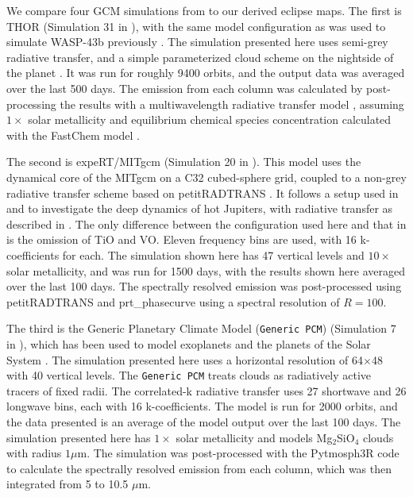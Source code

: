 \documentclass[twocolumn]{aastex631}
\begin{document}
We compare four GCM simulations from \citet{bell2023wasp43b} to our derived eclipse maps. The first is THOR \citep{mendoncca2016thor} (Simulation 31 in \citealp{bell2023wasp43b}), with the same model configuration as was used to simulate WASP-43b previously \citep{mendoncca2018revisiting,mendoncca2018three}. The simulation presented here uses semi-grey radiative transfer, and a simple parameterized cloud scheme on the nightside of the planet \citep{mendoncca2018revisiting}. It was run for roughly 9400 orbits, and the output data was averaged over the last 500 days. The emission from each column was calculated by post-processing the results with a multiwavelength radiative transfer model \citep{mendoncca2015new}, assuming $1{\times}$ solar metallicity and equilibrium chemical species concentration calculated with the FastChem model \citep{stock2018fastchem}.

The second is expeRT/MITgcm (Simulation 20 in \citealp{bell2023wasp43b}). This model uses the dynamical core of the MITgcm \citep{adcroft2004implementation} on a C32 cubed-sphere grid, coupled to a non-grey radiative transfer scheme based on petitRADTRANS \citep{molliere2019petitradtrans}. It follows a setup used in \citet{carone2020equatorial} and \citet{schneider2022exploring} to investigate the deep dynamics of hot Jupiters, with radiative transfer as described in \citet{schneider2022exploring}. The only difference between the configuration used here and that in \citet{schneider2022exploring} is the omission of TiO and VO. Eleven frequency bins are used, with 16 k-coefficients for each. The simulation shown here has 47 vertical levels and  $10{\times}$ solar metallicity, and was run for 1500 days, with the results shown here averaged over the last 100 days. The spectrally resolved emission was post-processed using petitRADTRANS \citep{molliere2019petitradtrans} and prt\_phasecurve \citep{schneider2022exploring} using a spectral resolution of $R=100$.

The third is the Generic Planetary Climate Model (\texttt{Generic PCM}) (Simulation 7 in \citealp{bell2023wasp43b}), which has been used to model exoplanets \citep{charnay_3d_2015,turbet_habitability_2016,teinturier2023} and the planets of the Solar System \citep{Turbet2021,Spiga2020}. The simulation presented here uses a horizontal resolution of 64$\times$48 with 40 vertical levels. The \texttt{Generic PCM} treats clouds as radiatively active tracers of fixed radii. The correlated-k radiative transfer uses 27 shortwave and 26 longwave bins, each with 16 k-coefficients. The model is run for 2000 orbits, and the data presented is an average of the model output over the last 100 days. The simulation presented here has $1{\times}$ solar metallicity and models Mg$_{2}$SiO$_{4}$ clouds with radius $1\mu$m.  The simulation was post-processed with the Pytmosph3R code \citep{falco2022toward} to calculate the spectrally resolved emission from each column, which was then integrated from 5 to 10.5 $\mu$m.
\end{document}
